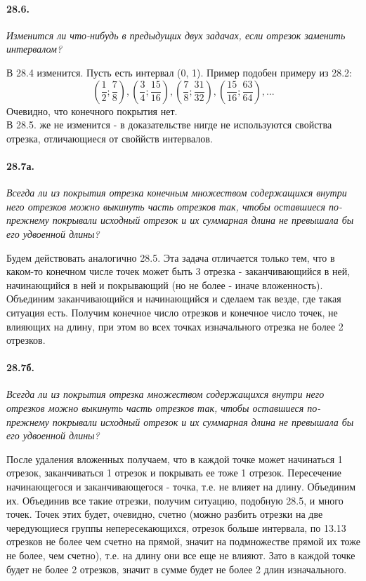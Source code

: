 \documentclass{book}
\begin{document}
\newpage

\paragraph{28.6.}
\textit{Изменится ли что-нибудь в предыдущих двух задачах, если отрезок заменить
интервалом?}

В 28.4 изменится. Пусть есть интервал (0, 1). Пример подобен примеру из 28.2:
\[(\frac{1}{2}; \frac{7}{8}), (\frac{3}{4}; \frac{15}{16}), (\frac{7}{8}; \frac{31}{32}), (\frac{15}{16}; \frac{63}{64}) , ...\] Очевидно, что конечного покрытия нет. \\
В 28.5. же не изменится - в доказательстве нигде не используются свойства отрезка, отличающиеся от своййств интервалов.

\paragraph{28.7а.}
\textit{Всегда ли из покрытия отрезка конечным множеством содержащихся внутри него отрезков можно выкинуть часть отрезков так, чтобы оставшиеся по-прежнему покрывали исходный отрезок и их суммарная длина не превышала бы его удвоенной длины?}

Будем действовать аналогично 28.5. Эта задача отличается только тем, что в каком-то конечном числе точек может быть 3 отрезка - заканчивающийся в ней, начинающийся в ней и покрывающий (но не более - иначе вложенность). Объединим заканчивающийся и начинающийся и сделаем так везде, где такая ситуация есть. Получим конечное число отрезков и конечное число точек, не влияющих на длину, при этом во всех точках изначального отрезка не более 2 отрезков. 


\paragraph{28.7б.}
\textit{Всегда ли из покрытия отрезка множеством содержащихся внутри него отрезков можно выкинуть часть отрезков так, чтобы оставшиеся по-прежнему покрывали исходный отрезок и их суммарная длина не превышала бы его удвоенной длины?}

После удаления вложенных получаем, что в каждой точке может начинаться 1 отрезок, заканчиваться 1 отрезок и покрывать ее тоже 1 отрезок. Пересечение начинающегося и заканчивающегося - точка, т.е. не влияет на длину. Объединим их. Объединив все такие отрезки, получим ситуацию, подобную 28.5, и много точек. Точек этих будет, очевидно, счетно (можно разбить отрезки на две чередующиеся группы непересекающихся, отрезок больше интервала, по 13.13 отрезков не более чем счетно на прямой, значит на подмножестве прямой их тоже не более, чем счетно), т.е. на длину они все еще не влияют. Зато в каждой точке будет не более 2 отрезков, значит в сумме будет не более 2 длин изначального.
\end{document}
